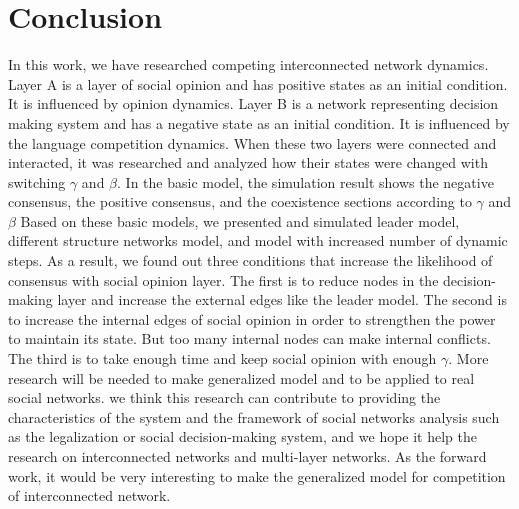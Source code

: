 \documentclass[english]{cccconf}
\begin{document}
\section{Conclusion}
In this work, we have researched competing interconnected network dynamics. Layer A is a layer of social opinion and has positive states as an initial condition. It is influenced by opinion dynamics. Layer B is a network representing decision making system and has a negative state as an initial condition. It is influenced by the language competition dynamics. When these two layers were connected and interacted, it was researched and analyzed how their states were changed with switching $\gamma$ and $\beta$. 
In the basic model, the simulation result shows the negative consensus, the positive consensus, and the coexistence sections according to $\gamma$ and $\beta$
Based on these basic models, we presented and simulated leader model, different structure networks model, and model with increased number of dynamic steps. As a result, we found out three conditions that increase the likelihood of consensus with social opinion layer. The first is to reduce nodes in the decision-making layer and increase the external edges like the leader model. The second is to increase the internal edges of social opinion in order to strengthen the power to maintain its state. But too many internal nodes can make internal conflicts. The third is to take enough time and keep social opinion with enough $\gamma$. 
More research will be needed to make generalized model and to be applied to real social networks. we think this research can contribute to providing the characteristics of the system and the framework of social networks analysis such as the legalization or social decision-making system, and we hope it help the research on interconnected networks and multi-layer networks. As the forward work, it would be very interesting to make the generalized model for competition of interconnected network.
\end{document}
